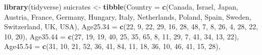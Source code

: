 \documentclass[
]{article}
\newenvironment{Shaded}{\begin{snugshade}}{\end{snugshade}}
\newcommand{\AttributeTok}[1]{\textcolor[rgb]{0.13,0.29,0.53}{#1}}
\newcommand{\DecValTok}[1]{\textcolor[rgb]{0.00,0.00,0.81}{#1}}
\newcommand{\FunctionTok}[1]{\textcolor[rgb]{0.13,0.29,0.53}{\textbf{#1}}}
\newcommand{\NormalTok}[1]{#1}
\newcommand{\OtherTok}[1]{\textcolor[rgb]{0.56,0.35,0.01}{#1}}
\newcommand{\StringTok}[1]{\textcolor[rgb]{0.31,0.60,0.02}{#1}}
\begin{document}
\begin{Shaded}
\begin{Highlighting}[]
 \FunctionTok{library}\NormalTok{(tidyverse)}
\NormalTok{ suicrates }\OtherTok{\textless{}{-}} \FunctionTok{tibble}\NormalTok{(}\AttributeTok{Country =} \FunctionTok{c}\NormalTok{(}\StringTok{\textquotesingle{}Canada\textquotesingle{}}\NormalTok{, }\StringTok{\textquotesingle{}Israel\textquotesingle{}}\NormalTok{, }\StringTok{\textquotesingle{}Japan\textquotesingle{}}\NormalTok{, }\StringTok{\textquotesingle{}Austria\textquotesingle{}}\NormalTok{, }\StringTok{\textquotesingle{}France\textquotesingle{}}\NormalTok{, }\StringTok{\textquotesingle{}Germany\textquotesingle{}}\NormalTok{,}
 \StringTok{\textquotesingle{}Hungary\textquotesingle{}}\NormalTok{, }\StringTok{\textquotesingle{}Italy\textquotesingle{}}\NormalTok{, }\StringTok{\textquotesingle{}Netherlands\textquotesingle{}}\NormalTok{, }\StringTok{\textquotesingle{}Poland\textquotesingle{}}\NormalTok{, }\StringTok{\textquotesingle{}Spain\textquotesingle{}}\NormalTok{, }\StringTok{\textquotesingle{}Sweden\textquotesingle{}}\NormalTok{, }\StringTok{\textquotesingle{}Switzerland\textquotesingle{}}\NormalTok{, }\StringTok{\textquotesingle{}UK\textquotesingle{}}\NormalTok{, }\StringTok{\textquotesingle{}USA\textquotesingle{}}\NormalTok{),}
 \AttributeTok{Age25.34 =} \FunctionTok{c}\NormalTok{(}\DecValTok{22}\NormalTok{, }\DecValTok{9}\NormalTok{, }\DecValTok{22}\NormalTok{, }\DecValTok{29}\NormalTok{, }\DecValTok{16}\NormalTok{, }\DecValTok{28}\NormalTok{, }\DecValTok{48}\NormalTok{, }\DecValTok{7}\NormalTok{, }\DecValTok{8}\NormalTok{, }\DecValTok{26}\NormalTok{, }\DecValTok{4}\NormalTok{, }\DecValTok{28}\NormalTok{, }\DecValTok{22}\NormalTok{, }\DecValTok{10}\NormalTok{, }\DecValTok{20}\NormalTok{),}
 \AttributeTok{Age35.44 =} \FunctionTok{c}\NormalTok{(}\DecValTok{27}\NormalTok{, }\DecValTok{19}\NormalTok{, }\DecValTok{19}\NormalTok{, }\DecValTok{40}\NormalTok{, }\DecValTok{25}\NormalTok{, }\DecValTok{35}\NormalTok{, }\DecValTok{65}\NormalTok{, }\DecValTok{8}\NormalTok{, }\DecValTok{11}\NormalTok{, }\DecValTok{29}\NormalTok{, }\DecValTok{7}\NormalTok{, }\DecValTok{41}\NormalTok{, }\DecValTok{34}\NormalTok{, }\DecValTok{13}\NormalTok{, }\DecValTok{22}\NormalTok{),}
 \AttributeTok{Age45.54 =} \FunctionTok{c}\NormalTok{(}\DecValTok{31}\NormalTok{, }\DecValTok{10}\NormalTok{, }\DecValTok{21}\NormalTok{, }\DecValTok{52}\NormalTok{, }\DecValTok{36}\NormalTok{, }\DecValTok{41}\NormalTok{, }\DecValTok{84}\NormalTok{, }\DecValTok{11}\NormalTok{, }\DecValTok{18}\NormalTok{, }\DecValTok{36}\NormalTok{, }\DecValTok{10}\NormalTok{, }\DecValTok{46}\NormalTok{, }\DecValTok{41}\NormalTok{, }\DecValTok{15}\NormalTok{, }\DecValTok{28}\NormalTok{),}

\end{Highlighting}
\end{Shaded}
\end{document}
